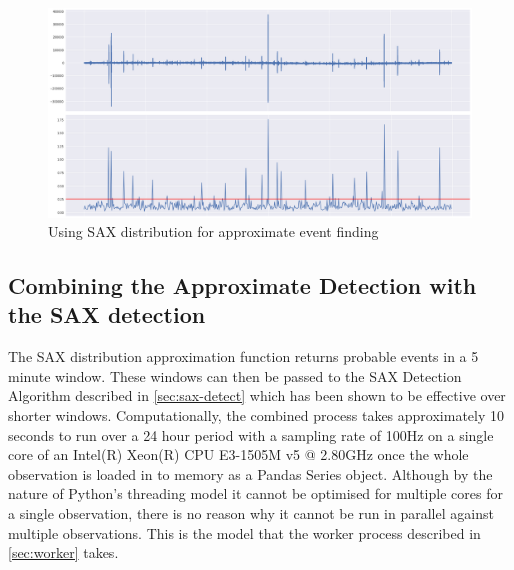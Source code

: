 \documentclass[../report.tex]{subfiles}
\begin{document}
\begin{figure}[H]
	\centering
	\includegraphics[width=1\linewidth]{img/dist_test}
	\caption{Using SAX distribution for approximate event finding}
	\label{fig:disttest}
\end{figure}

\subsection{Combining the Approximate Detection with the SAX detection} \label{sec:sax-combined}

	The SAX distribution approximation function returns probable events in a 5 minute window.  These windows can then be passed to the SAX Detection Algorithm described in \cref{sec:sax-detect} which has been shown to be effective over shorter windows.  Computationally, the combined process takes approximately 10 seconds to run over a 24 hour period with a sampling rate of 100Hz on a single core of an Intel(R) Xeon(R) CPU E3-1505M v5 @ 2.80GHz once the whole observation is loaded in to memory as a Pandas Series object.  Although by the nature of Python's threading model it cannot be optimised for multiple cores for a single observation, there is no reason why it cannot be run in parallel against multiple observations.  This is the model that the worker process described in \cref{sec:worker} takes.
	
\end{document}
